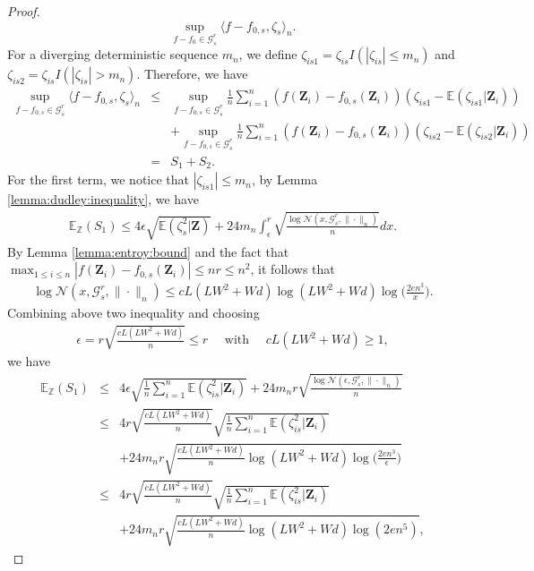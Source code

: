 \documentclass[11pt, preprint]{imsart}
\numberwithin{equation}{section}
\def \mcG{\mathcal{G}}
\def \mcN{\mathcal{N}}
\def \bfZ{\mathbf{Z}}
\def \ev{\mathbb{E}}
\theoremstyle{plain}
\theoremstyle{definition}
\begin{document}
\begin{proof}
\begin{equation*}
	\sup_{f-f_0\in \mcG_s^r}\langle f-f_{0,s}, \zeta_s\rangle_n.
\end{equation*}
For a diverging deterministic sequence $m_n$, we define $\zeta_{is1}=\zeta_{is}I(|\zeta_{is}|\leq m_n)$ and $\zeta_{is2}=\zeta_{is}I(|\zeta_{is}|> m_n)$. Therefore, we have
\begin{eqnarray}
	\sup_{f-f_{0,s}\in \mcG_s^r}\langle f-f_{0,s}, \zeta_s\rangle_n
	&\leq& \sup_{f-f_{0,s}\in \mcG_s^r}\frac{1}{n}\sum_{i=1}^n(f(\bfZ_i)-f_{0,s}(\bfZ_i))(\zeta_{is1}-\ev(\zeta_{is1}|\bfZ_i))\nonumber\\
	&&+\sup_{f-f_{0,s}\in \mcG_s^r}\frac{1}{n}\sum_{i=1}^n(f(\bfZ_i)-f_{0,s}(\bfZ_i))(\zeta_{is2}-\ev(\zeta_{is2}|\bfZ_i))\nonumber\\
	&=&S_1+S_2.\label{eq:lemma:rate:of:convergence:eq5}
\end{eqnarray}
For the first term, we notice that $|\zeta_{is1}|\leq m_n$, by Lemma \ref{lemma:dudley:inequality}, we have
\begin{eqnarray}
	\ev_{\mathbb{Z}}(S_1)\leq 4\epsilon\sqrt{\ev(\zeta_s^2|\bfZ)}+24m_n\int_{\epsilon}^{r}\sqrt{\frac{\log \mcN(x, \mcG_s^r, \|\cdot\|_n)}{n}}dx\nonumber.
\end{eqnarray}
By Lemma \ref{lemma:entroy:bound} and the fact that $\max_{1\leq i\leq n}|f(\bfZ_i)-f_{0,s}(\bfZ_i)|\leq nr\leq n^2$, it follows that 
\begin{eqnarray}
	\log \mcN(x, \mcG_s^r, \|\cdot\|_n)\leq cL(LW^2+Wd)\log(LW^2+Wd)\log\bigg(\frac{2en^3}{x}\bigg).\nonumber
\end{eqnarray}
Combining above two inequality and choosing
\begin{eqnarray}
	\epsilon=r\sqrt{\frac{cL(LW^2+Wd)}{n}}\leq r\quad \textrm{ with }\quad cL(LW^2+Wd)\geq 1,\nonumber
\end{eqnarray}
we have
\begin{eqnarray}
	\ev_{\mathbb{Z}}(S_1)&\leq& 4\epsilon\sqrt{\frac{1}{n}\sum_{i=1}^n\ev(\zeta_{is}^2|\bfZ_i)}+24m_nr\sqrt{\frac{\log \mcN(\epsilon, \mcG_s^r, \|\cdot\|_n)}{n}}\nonumber\\
	&\leq& 4r\sqrt{\frac{cL(LW^2+Wd)}{n}}\sqrt{\frac{1}{n}\sum_{i=1}^n\ev(\zeta_{is}^2|\bfZ_i)}\nonumber\\
	&&+24m_nr\sqrt{\frac{cL(LW^2+Wd)}{n}\log(LW^2+Wd)\log\bigg(\frac{2en^3}{\epsilon}\bigg)}\nonumber\\
		&\leq& 4r\sqrt{\frac{cL(LW^2+Wd)}{n}}\sqrt{\frac{1}{n}\sum_{i=1}^n\ev(\zeta_{is}^2|\bfZ_i)}\nonumber\\
	&&+24m_nr\sqrt{\frac{cL(LW^2+Wd)}{n}\log(LW^2+Wd)\log(2en^5)},

\end{eqnarray}
\end{proof}
\end{document}
